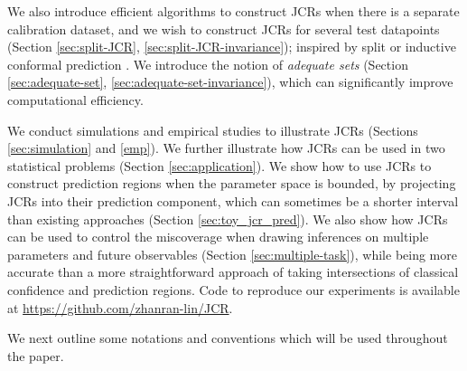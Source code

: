 \documentclass[english]{article}
\begin{document}
We also introduce efficient algorithms to construct JCRs when there is a separate calibration dataset, and we wish to construct JCRs for several test datapoints (Section \ref{sec:split-JCR}, \ref{sec:split-JCR-invariance}); inspired by split or inductive conformal prediction \citep{papadopoulos2002inductive}.
We introduce the notion of \emph{adequate sets} (Section \ref{sec:adequate-set}, \ref{sec:adequate-set-invariance}), which can significantly improve computational efficiency.
 

We conduct simulations and empirical studies to illustrate JCRs (Sections \ref{sec:simulation} and \ref{emp}).
We further illustrate how JCRs can be used in two statistical problems
(Section \ref{sec:application}). 
We show how to use JCRs to construct prediction regions when the parameter space is bounded,
by projecting JCRs into their prediction component, which can sometimes be a shorter interval than existing approaches (Section \ref{sec:toy_jcr_pred}).
We also show how JCRs can be used to control the miscoverage when drawing inferences on multiple parameters and future observables  (Section \ref{sec:multiple-task}),
while being more accurate than a more straightforward approach of taking intersections of classical confidence and prediction regions.
Code to reproduce our experiments is available at \url{https://github.com/zhanran-lin/JCR}.


We next outline some notations and conventions which will be used throughout the paper.
\end{document}
